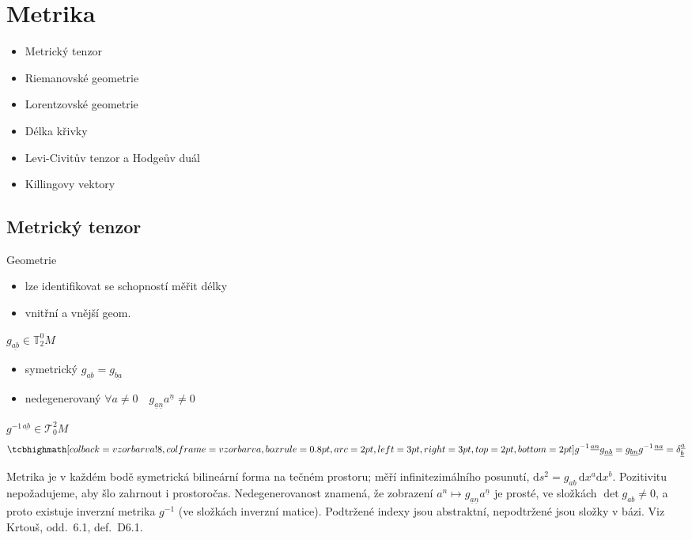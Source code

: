 \section{Metrika}
\begin{itemize}[nosep]
  \item Metrický tenzor
  \item Riemanovské geometrie
  \item Lorentzovské geometrie
  \item Délka křivky
  \item Levi-Civitův tenzor a Hodgeův duál
  \item Killingovy vektory
\end{itemize}

\subsection{Metrický tenzor} 

Geometrie
\begin{itemize}[nosep]
  \item[--] lze identifikovat se schopností měřit délky
  \item[--] vnitřní a vnější geom.
\end{itemize}

\begin{definice}
 \quad $g_{\underline{ab}}\in\mathbb{T}^0_2M$
\begin{itemize}[nosep]
  \item[--] symetrický \hfill $g_{\underline{ab}} = g_{\underline{ba}}$
  \item[--] nedegenerovaný \hfill $\forall a\neq 0 \quad g_{\underline{a}\underline{n}}a^{\underline{n}}\neq 0$
\end{itemize}
 \quad $g^{-1\,\underline{ab}}\in\mathcal{T}^2_0M$
\[
  \vzorec{g^{-1\,\underline{an}}g_{\underline{nb}} = g_{\underline{bn}}g^{-1\,\underline{na}} = \delta^{\underline{a}}_{\underline{b}}}
\]
\end{definice}

\begin{vysvetleni}[Metrika]
Metrika je v každém bodě symetrická bilineární forma na tečném prostoru; měří  infinitezimálního posunutí, $\mathrm{d}s^2=g_{ab}\,\mathrm{d}x^a\mathrm{d}x^b$. Pozitivitu nepožadujeme, aby šlo zahrnout i prostoročas. Nedegenerovanost znamená, že zobrazení $a^n\mapsto g_{\underline{a}\underline{n}}a^{\underline{n}}$ je prosté, ve složkách $\det g_{ab}\neq0$, a proto existuje inverzní metrika $g^{-1}$ (ve složkách inverzní matice).
Podtržené indexy jsou abstraktní, nepodtržené jsou složky v bázi. Viz Krtouš, odd.~6.1, def.~D6.1.
\end{vysvetleni}

